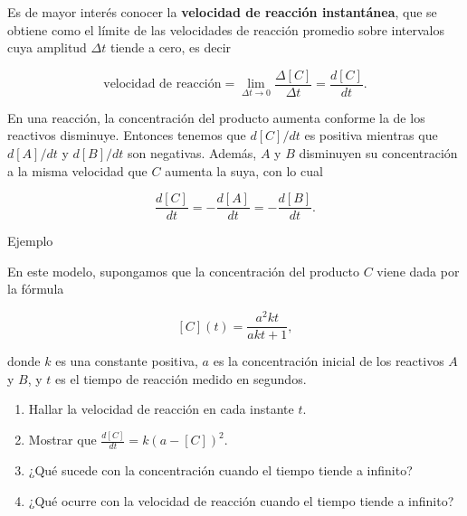 \documentclass[
  letterpaper,
]{book}
\theoremstyle{plain}
\theoremstyle{remark}
\begin{document}
Es de mayor interés conocer la \textbf{velocidad de reacción
instantánea}, que se obtiene como el límite de las velocidades de
reacción promedio sobre intervalos cuya amplitud \(\Delta t\) tiende a
cero, es decir

\[
\text{velocidad de reacción}=\lim_{\Delta t\to 0}\frac{\Delta [C]}{\Delta t}=\frac{d[C]}{dt}.
\]

En una reacción, la concentración del producto aumenta conforme la de
los reactivos disminuye. Entonces tenemos que \(d[C]/dt\) es positiva
mientras que \(d[A]/dt\) y \(d[B]/dt\) son negativas. Además, \(A\) y
\(B\) disminuyen su concentración a la misma velocidad que \(C\) aumenta
la suya, con lo cual

\[
\frac{d[C]}{dt}=-\frac{d[A]}{dt}=-\frac{d[B]}{dt}.
\]

Ejemplo

En este modelo, supongamos que la concentración del producto \(C\) viene
dada por la fórmula

\[
[C](t)=\frac{a^2kt}{akt+1},
\]

donde \(k\) es una constante positiva, \(a\) es la concentración inicial
de los reactivos \(A\) y \(B\), y \(t\) es el tiempo de reacción medido
en segundos.

\begin{enumerate}
\def\labelenumi{\arabic{enumi}.}
\item
  Hallar la velocidad de reacción en cada instante \(t\).
\item
  Mostrar que \(\displaystyle \frac{d[C]}{dt}=k(a-[C])^2\).
\item
  ¿Qué sucede con la concentración cuando el tiempo tiende a infinito?
\item
  ¿Qué ocurre con la velocidad de reacción cuando el tiempo tiende a
  infinito?
\end{enumerate}
\end{document}

